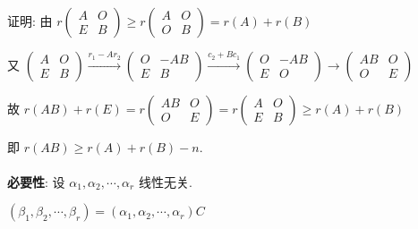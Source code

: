 	 \paragraph{} %
		 证明: 由 \( r\begin{pmatrix} A & O \\ E & B \end{pmatrix} \geq r\begin{pmatrix} A & O \\ O & B \end{pmatrix} = r(A) + r(B) \)

		 又 \(
		 \begin{pmatrix}
			 A & O \\
			 E & B
		 \end{pmatrix} \xrightarrow{r_{1}-A r_{2}}
		 \begin{pmatrix}
			 O & -AB \\
			 E & B
		 \end{pmatrix} \xrightarrow{c_{2}+B c_{1}}
		 \begin{pmatrix}
			 O & -AB \\
			 E & O
		 \end{pmatrix} \to
		 \begin{pmatrix}
			 AB & O \\
			 O  & E
		 \end{pmatrix} \)

		 故 \( r(AB) + r(E) = r\begin{pmatrix}
			 AB & O \\
			 O  & E
		 \end{pmatrix} = r\begin{pmatrix}
			 A & O \\
			 E & B
		 \end{pmatrix} \geq r(A) + r(B) \)

		 即 \( r(AB) \geq r(A) + r(B) - n \).


	 \paragraph{} %
		 \textbf{必要性}: 设 \( \alpha_{1}, \alpha_{2}, \cdots, \alpha_{r} \) 线性无关.

		 \( (\beta_{1}, \beta_{2}, \cdots, \beta_{r}) = (\alpha_{1}, \alpha_{2}, \cdots, \alpha_{r})C \)

